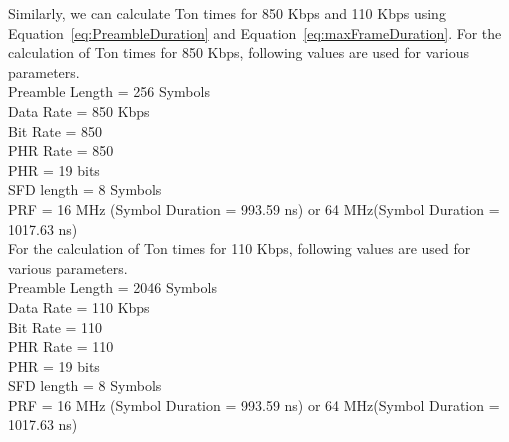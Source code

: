 \vspace{3cm}
Similarly, we can calculate Ton times for 850 Kbps and 110 Kbps using Equation~\ref{eq:PreambleDuration} and Equation~\ref{eq:maxFrameDuration}. For the calculation of Ton times for 850 Kbps, following values are used for various parameters.
\vspace{0.2cm}
\\Preamble Length = 256 Symbols \\
Data Rate = 850 Kbps \\
Bit Rate = 850 \\
PHR Rate = 850 \\
PHR = 19 bits \\
SFD length = 8 Symbols \\
PRF = 16 MHz (Symbol Duration = 993.59 ns) or 64 MHz(Symbol Duration = 1017.63 ns)\\

For the calculation of Ton times for 110 Kbps, following values are used for various parameters.
\vspace{0.1cm}
\\Preamble Length = 2046 Symbols \\
Data Rate = 110 Kbps \\
Bit Rate = 110 \\
PHR Rate = 110 \\
PHR = 19 bits \\
SFD length = 8 Symbols \\
PRF = 16 MHz (Symbol Duration = 993.59 ns) or 64 MHz(Symbol Duration = 1017.63 ns)\\


